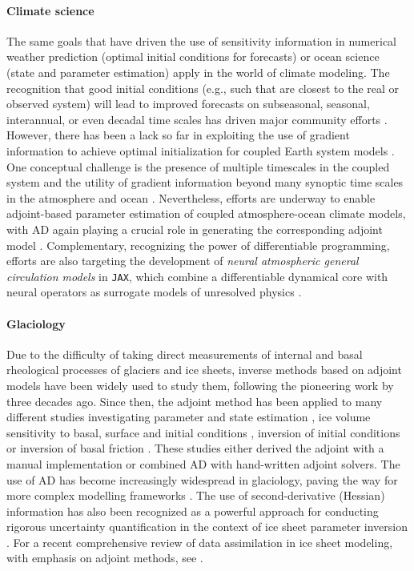 \paragraph{Climate science}

The same goals that have driven the use of sensitivity information in numerical weather prediction (optimal initial conditions for forecasts) or ocean science (state and parameter estimation) apply in the world of climate modeling.
The recognition that good initial conditions (e.g., such that are closest to the real or observed system) will lead to improved forecasts on subseasonal, seasonal, interannual, or even decadal time scales has driven major community efforts \cite{Meehl.2021}. However, there has been a lack so far in exploiting the use of gradient information to achieve optimal initialization for coupled Earth system models \cite{Frolov.2023}. 
One conceptual challenge is the presence of multiple timescales in the coupled system and the utility of gradient information beyond many synoptic time scales in the atmosphere and ocean \cite{Lea.2000,Lea:2002cv}.
Nevertheless, efforts are underway to enable adjoint-based parameter estimation of coupled atmosphere-ocean climate models, with AD again playing a crucial role in generating the corresponding adjoint model
\cite{Blessing.2014,Lyu.2018,Stammer:2018de}.
Complementary, recognizing the power of differentiable programming, efforts are also targeting the development of \textit{neural atmospheric general circulation models} in \texttt{JAX}, which combine a differentiable dynamical core with neural operators as surrogate models of unresolved physics
\cite{Kochkov.2023}.

\paragraph{Glaciology}

Due to the difficulty of taking direct measurements of internal and basal rheological processes of glaciers and ice sheets, inverse methods based on adjoint models have been widely used to study them, following the pioneering work by \cite{macayeal1992basal} three decades ago. 
Since then, the adjoint method has been applied to many different studies investigating parameter and state estimation \cite{Vieli.2006, goldberg2013parameter}, ice volume sensitivity to basal, surface and initial conditions \cite{heimbach2009greenland}, inversion of initial conditions \cite{mosbeux2016comparison} or inversion of basal friction \cite{Petra.2012, morlighem2013inversion}.
These studies either derived the adjoint with a manual implementation or combined AD with hand-written adjoint solvers. 
The use of AD has become increasingly widespread in glaciology, paving the way for more complex modelling frameworks \cite{hascoet2018source, Gaikwad.2023}. 
The use of second-derivative (Hessian) information has also been recognized as a powerful approach for conducting rigorous uncertainty quantification in the context of ice sheet parameter inversion \cite{Petra.2014,Isaac:2015hf}.
For a recent comprehensive review of data assimilation in ice sheet modeling, with emphasis on adjoint methods, see \cite{Morlighem.2023}.

